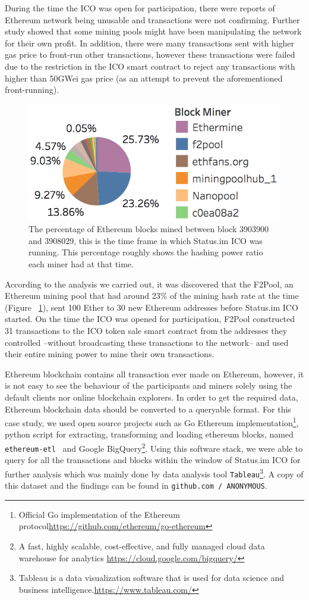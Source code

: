 During the time the ICO was open for participation, there were reports of Ethereum network being unusable and transactions were not confirming. Further study showed that some mining pools might have been manipulating the network for their own profit. In addition, there were many transactions sent with higher gas price to front-run other transactions, however these transactions were failed due to the restriction in the ICO smart contract to reject any transactions with higher than 50GWei gas price (as an attempt to prevent the aforementioned front-running).


\begin{figure}[h]
\centering
\includegraphics[width=0.5\linewidth]{figures/Mining_pool_ratio.png}
\caption{The percentage of Ethereum blocks mined between block 3903900 and 3908029, this is the time frame in which Status.im ICO was running. This percentage roughly shows the hashing power ratio each miner had at that time. \label{fig:mining_pool_ratio}} %
\end{figure}

According to the analysis we carried out, it was discovered that the F2Pool, an Ethereum mining pool that had around 23\% of the mining hash rate at the time (Figure ~\ref{fig:mining_pool_ratio}), sent 100 Ether to 30 new Ethereum addresses before Status.im ICO started. On the time the ICO was opened for participation, F2Pool constructed 31 transactions to the ICO token sale smart contract from the addresses they controlled --without broadcasting these transactions to the network-- and used their entire mining power to mine their own transactions.

Ethereum blockchain contains all transaction ever made on Ethereum, however, it is not easy to see the behaviour of the participants and miners solely using the default clients nor online blockchain explorers. In order to get the required data, Ethereum blockchain data should be converted to a queryable format. For this case study, we used open source projects such as Go Ethereum implementation\footnote{Official Go implementation of the Ethereum protocol\url{https://github.com/ethereum/go-ethereum}}, python script for extracting, transforming and loading ethereum blocks, named \texttt{ethereum-etl}~\cite{ethereumetl} and Google BigQuery\footnote{A fast, highly scalable, cost-effective, and fully managed cloud data warehouse for analytics \url{https://cloud.google.com/bigquery/}}. Using this software stack, we were able to query for all the transactions and blocks within the window of Status.im ICO for further analysis which was mainly done by data analysis tool \texttt{Tableau}\footnote{Tableau is a data visualization software that is used for data science and business intelligence.\url{https://www.tableau.com/}}. A copy of this dataset and the findings can be found in \texttt{github.com / ANONYMOUS}. 


